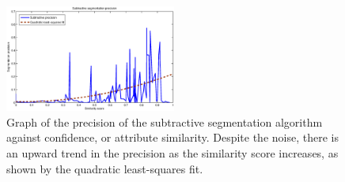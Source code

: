 \documentclass[10pt,twocolumn,letterpaper]{article}
\begin{document}
\begin{figure}
\centering
\includegraphics[width=0.5\textwidth]{figures/SubSegPrec.eps}
\caption{Graph of the precision of the subtractive segmentation
algorithm against confidence, or attribute similarity.  Despite
the noise, there is an upward trend in the precision
as the similarity score increases, as shown by the 
quadratic least-squares fit.}
\label{fig:sub_seg_prec}
\end{figure}



\end{document}
